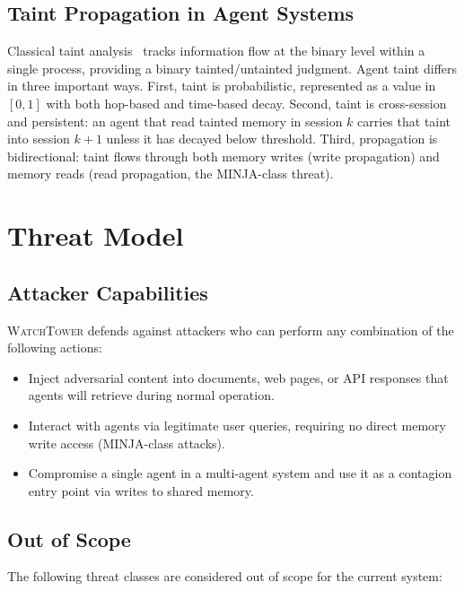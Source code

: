 \documentclass[conference]{IEEEtran}
\begin{document}
\subsection{Taint Propagation in Agent Systems}

Classical taint analysis~\cite{newsome2005} tracks information flow at the
binary level within a single process, providing a binary tainted/untainted
judgment. Agent taint differs in three important ways. First, taint is
probabilistic, represented as a value in $[0, 1]$ with both hop-based and
time-based decay. Second, taint is cross-session and persistent: an agent
that read tainted memory in session $k$ carries that taint into session
$k+1$ unless it has decayed below threshold. Third, propagation is
bidirectional: taint flows through both memory writes (write propagation)
and memory reads (read propagation, the MINJA-class threat).

\section{Threat Model}
\label{sec:threat}

\subsection{Attacker Capabilities}

\textsc{WatchTower} defends against attackers who can perform any
combination of the following actions:

\begin{itemize}
\item Inject adversarial content into documents, web pages, or API
      responses that agents will retrieve during normal operation.
\item Interact with agents via legitimate user queries, requiring no
      direct memory write access (MINJA-class attacks).
\item Compromise a single agent in a multi-agent system and use it as
      a contagion entry point via writes to shared memory.
\end{itemize}

\subsection{Out of Scope}

The following threat classes are considered out of scope for the current
system:
\end{document}
